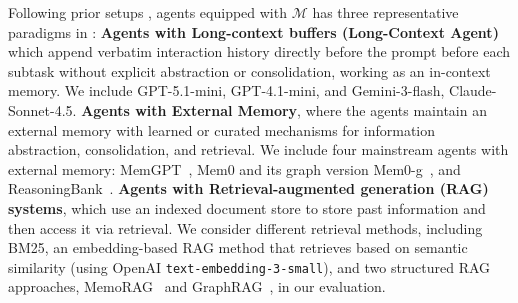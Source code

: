 


Following prior setups \citep{wulongmemeval, hu2025evaluating}, agents equipped with $\mathcal{M}$ has three representative paradigms in \ours:
\textbf{Agents with Long-context buffers (Long-Context Agent)} which append verbatim interaction history directly before the prompt before each subtask without explicit abstraction or consolidation, working as an in-context memory. We include GPT-5.1-mini, GPT-4.1-mini, and Gemini-3-flash, Claude-Sonnet-4.5. 
\textbf{Agents with External Memory}, where the agents maintain an external memory with learned or curated mechanisms for information abstraction, consolidation, and retrieval. We include four mainstream agents with external memory: MemGPT~\citep{packer2023memgpt}, Mem0 and its graph version Mem0-g~\citep{mem0}, 
and ReasoningBank~\citep{ouyang2025reasoningbank}.
\textbf{Agents with Retrieval-augmented generation (RAG) systems}, which use an indexed document store to store past information and then access it via retrieval. We consider different retrieval methods, including BM25, an embedding-based RAG method that retrieves based on semantic similarity (using OpenAI \texttt{text-embedding-3-small}), and two structured RAG approaches, MemoRAG~\citep{qian2025memorag} and GraphRAG~\citep{edge2024local}, in our evaluation. 


